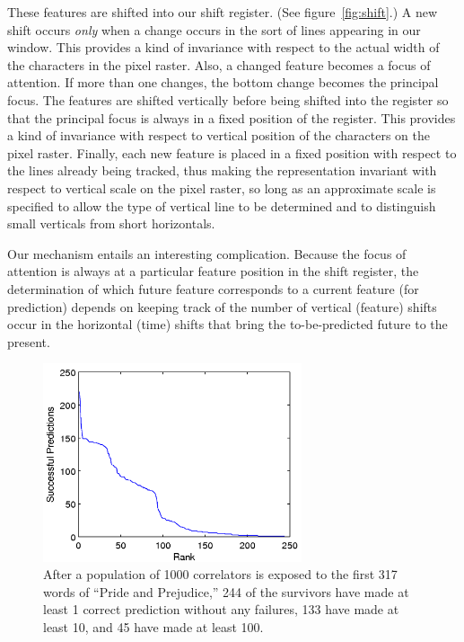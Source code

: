 \documentclass[letterpaper]{article}
\begin{document}
These features are shifted into our shift register. (See
figure~\ref{fig:shift}.)  A new shift occurs {\em only} when a change
occurs in the sort of lines appearing in our window.  This provides a
kind of invariance with respect to the actual width of the characters
in the pixel raster.  Also, a changed feature becomes a focus of
attention.  If more than one changes, the bottom change becomes the
principal focus.  The features are shifted vertically before being
shifted into the register so that the principal focus is always in a
fixed position of the register.  This provides a kind of invariance
with respect to vertical position of the characters on the pixel
raster.  Finally, each new feature is placed in a fixed position with
respect to the lines already being tracked, thus making the
representation invariant with respect to vertical scale on the pixel
raster, so long as an approximate scale is specified to allow the type
of vertical line to be determined and to distinguish small verticals
from short horizontals.

Our mechanism entails an interesting complication.  Because the focus
of attention is always at a particular feature position in the shift
register, the determination of which future feature corresponds to a
current feature (for prediction) depends on keeping track of the
number of vertical (feature) shifts occur in the horizontal (time)
shifts that bring the to-be-predicted future to the present.

\begin{figure}
\centering
\includegraphics[width=3in]{austen.png}
\caption{After a population of 1000 correlators is exposed to the
  first 317 words of ``Pride and Prejudice,'' 244 of the survivors
  have made at least 1 correct prediction without any failures, 133
  have made at least 10, and 45 have made at least 100.}
\label{f:results}
\end{figure}
\end{document}
